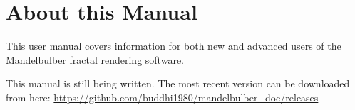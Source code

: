 \section{About this Manual}

This user manual covers information for both new and advanced users of the Mandelbulber fractal rendering software.

This manual is still being written. The most recent version can be downloaded from here: \url{https://github.com/buddhi1980/mandelbulber_doc/releases}
